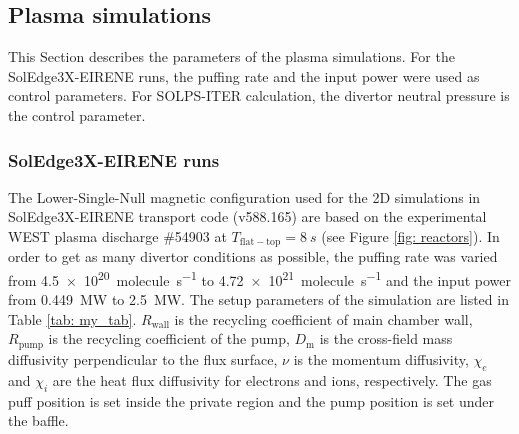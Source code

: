 


\subsection{Plasma simulations}
This Section describes the parameters of the plasma simulations.
For the SolEdge3X-EIRENE runs, the puffing rate and the input power were used as control parameters.
For SOLPS-ITER calculation, the divertor neutral pressure is the control parameter.
\subsubsection{SolEdge3X-EIRENE runs}
The Lower-Single-Null magnetic configuration used for the 2D simulations in SolEdge3X-EIRENE transport code (v588.165) are based on the experimental WEST plasma discharge \#54903 at $T_\mathrm{flat-top} = \SI{8}{s}$ (see Figure \ref{fig: reactors}).
In order to get as many divertor conditions as possible, the puffing rate was varied from \SI{4.5e20}{molecule.s^{-1}} to \SI{4.72e21}{molecule.s^{-1}} and the input power from \SI{0.449}{MW} to \SI{2.5}{MW}.
The setup parameters of the simulation are listed in Table \ref{tab: my_tab}.
$R_\mathrm{wall}$ is the recycling coefficient of main chamber wall, $R_\mathrm{pump}$ is the recycling coefficient of the pump, $D_\mathrm{m}$ is the cross-field mass diffusivity perpendicular to the flux surface, $\nu$ is the momentum diffusivity, $\chi_e$ and $\chi_i$ are the heat flux diffusivity for electrons and ions, respectively.
The gas puff position is set inside the private region and the pump position is set under the baffle.


